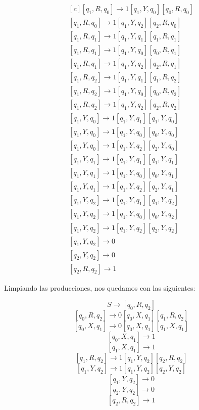 \documentclass[11pt,a4paper]{article}
\begin{document}
\begin{equation*}
\begin{aligned}[c]
			[q_1, R, q_0] \rightarrow 1[q_1, Y, q_0][q_0, R, q_0] \\
			[q_1, R, q_0] \rightarrow 1[q_1, Y, q_2][q_2, R, q_0] \\
			[q_1, R, q_1] \rightarrow 1[q_1, Y, q_1][q_1, R, q_1] \\
			[q_1, R, q_1] \rightarrow 1[q_1, Y, q_0][q_0, R, q_1] \\
			[q_1, R, q_1] \rightarrow 1[q_1, Y, q_2][q_2, R, q_1] \\
			[q_1, R, q_2] \rightarrow 1[q_1, Y, q_1][q_1, R, q_2] \\
			[q_1, R, q_2] \rightarrow 1[q_1, Y, q_0][q_0, R, q_2] \\
			[q_1, R, q_2] \rightarrow 1[q_1, Y, q_2][q_2, R, q_2] \\
			[q_1, Y, q_0] \rightarrow 1[q_1, Y, q_1][q_1, Y, q_0] \\
			[q_1, Y, q_0] \rightarrow 1[q_1, Y, q_0][q_0, Y, q_0] \\
			[q_1, Y, q_0] \rightarrow 1[q_1, Y, q_2][q_2, Y, q_0] \\
			[q_1, Y, q_1] \rightarrow 1[q_1, Y, q_1][q_1, Y, q_1] \\
			[q_1, Y, q_1] \rightarrow 1[q_1, Y, q_0][q_0, Y, q_1] \\
			[q_1, Y, q_1] \rightarrow 1[q_1, Y, q_2][q_2, Y, q_1] \\
			[q_1, Y, q_2] \rightarrow 1[q_1, Y, q_1][q_1, Y, q_2] \\
			[q_1, Y, q_2] \rightarrow 1[q_1, Y, q_0][q_0, Y, q_2] \\
			[q_1, Y, q_2] \rightarrow 1[q_1, Y, q_2][q_2, Y, q_2] \\
			[q_1, Y, q_2] \rightarrow 0 \qquad \qquad \qquad \qquad \\
			[q_2, Y, q_2] \rightarrow 0 \qquad \qquad \qquad \qquad \\
			[q_2, R, q_2] \rightarrow 1 \qquad \qquad \qquad \qquad
			\end{aligned}
		\end{equation*}
		
		Limpiando las producciones, nos quedamos con las siguientes:
		
		\[S \rightarrow [q_0, R, q_2]\]
		\[[q_0, R, q_2] \rightarrow 0[q_0, X, q_1][q_1, R, q_2]\]
		\[[q_0, X, q_1] \rightarrow 0[q_0, X, q_1][q_1, X, q_1]\]
		\[[q_0, X, q_1] \rightarrow 1\]
		\[[q_1, X, q_1] \rightarrow 1\]
		\[[q_1, R, q_2] \rightarrow 1[q_1, Y, q_2][q_2, R, q_2]\]
		\[[q_1, Y, q_2] \rightarrow 1[q_1, Y, q_2][q_2, Y, q_2]\]
		\[[q_1, Y, q_2] \rightarrow 0\]
		\[[q_2, Y, q_2] \rightarrow 0\]
		\[[q_2, R, q_2] \rightarrow 1\]
		
\end{document}

